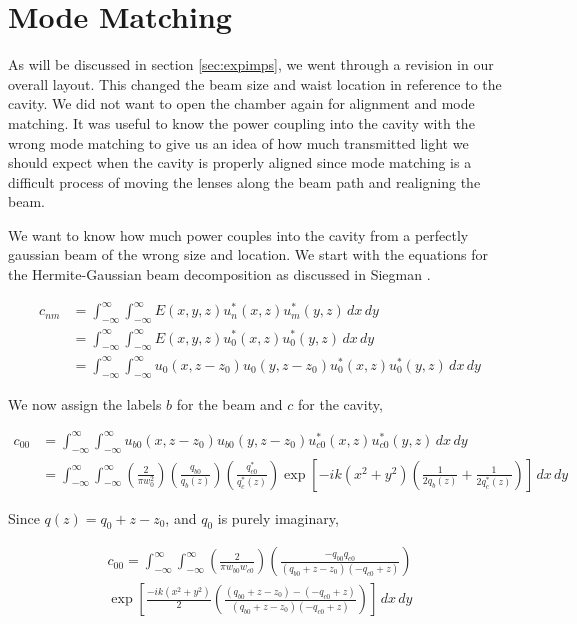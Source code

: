 
\section{Mode Matching}
As will be discussed in section
\ref{sec:expimps}, we went through a revision in our overall layout.
This changed the beam size and waist location in reference to the cavity.
We did not want to open the chamber again for alignment and mode matching.
It was useful to know the power coupling into the cavity with the wrong
mode matching to give us an idea of how much transmitted light we should
expect when the cavity is properly aligned since mode matching is a difficult
process of moving the lenses along the beam path and realigning the beam.

We want to know how much power couples into the cavity from a
perfectly gaussian beam of the wrong size and location. We start with
the equations for the Hermite-Gaussian beam decomposition as discussed in
Siegman \cite{Siegman86}. 

\newcommand{\intinfxy}[1]{\int^{\infty}_{- \infty} \int^{\infty}_{- \infty} #1 \,dx \,dy}
\newcommand{\intinfrt}[1]{\int^{2 \pi}_{0} \int^{\infty}_{0} #1 r \,dr \,d\theta}


\begin{align}
    c_{nm} &= \intinfxy{
    E(x,y,z) u_n^*(x,z)u_m^*(y,z)} \nonumber
\\  &= \intinfxy{
    E(x,y,z) u_0^*(x,z)u_0^*(y,z)} \nonumber
\\  &= \intinfxy{
    u_0(x,z-z_0)u_0(y,z-z_0) u_0^*(x,z)u_0^*(y,z)}
\end{align}

We now assign the labels $b$ for the beam and $c$ for the cavity,

\begin{align}
    c_{00} &= \intinfxy{
    u_{b0}(x,z-z_0)u_{b0}(y,z-z_0) u_{c0}^*(x,z)u_{c0}^*(y,z)} \nonumber
\\  &= \intinfxy{ \left( \frac{2}{\pi w^2_0} \right) \left( \frac{q_{b0}}{q_{b}(z)} \right)
    \left( \frac{q^*_{c0}}{q^*_{c}(z)} \right) \exp \left[-ik \left( x^2 + y^2  \right)
    \left( \frac{1}{2q_b(z)} + \frac{1}{2q^*_c(z)} \right) \right]}
\end{align}

Since $q(z) = q_0 + z - z_0$, and $q_0$ is purely imaginary,


\begin{multline}
    c_{00} = \intinfxy{ \left( \frac{2}{\pi w_{b0} w_{c0}} \right)
    \left( \frac{- q_{b0} q_{c0}}{(q_{b0}+z-z_0)(-q_{c0}+z)} \right) \\
    \exp \left[
    \frac{-ik \left( x^2 + y^2  \right)}{2} \left( \frac{(q_{b0}+z-z_0)-(-q_{c0}+z)}{(q_{b0}+z-z_0)(-q_{c0}+z)} \right)
    \right]}
\end{multline}

